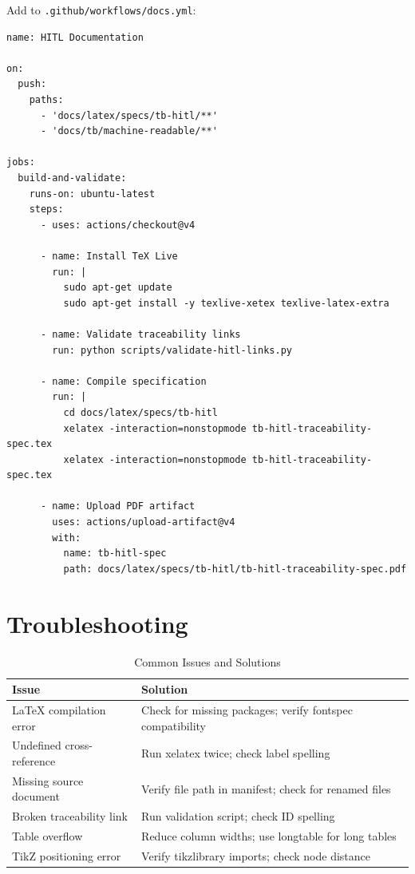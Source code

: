 Add to \texttt{.github/workflows/docs.yml}:

\begin{lstlisting}[language=yamlx,basicstyle=\ttfamily\small]
name: HITL Documentation

on:
  push:
    paths:
      - 'docs/latex/specs/tb-hitl/**'
      - 'docs/tb/machine-readable/**'

jobs:
  build-and-validate:
    runs-on: ubuntu-latest
    steps:
      - uses: actions/checkout@v4
      
      - name: Install TeX Live
        run: |
          sudo apt-get update
          sudo apt-get install -y texlive-xetex texlive-latex-extra
      
      - name: Validate traceability links
        run: python scripts/validate-hitl-links.py
      
      - name: Compile specification
        run: |
          cd docs/latex/specs/tb-hitl
          xelatex -interaction=nonstopmode tb-hitl-traceability-spec.tex
          xelatex -interaction=nonstopmode tb-hitl-traceability-spec.tex
      
      - name: Upload PDF artifact
        uses: actions/upload-artifact@v4
        with:
          name: tb-hitl-spec
          path: docs/latex/specs/tb-hitl/tb-hitl-traceability-spec.pdf
\end{lstlisting}

\section{Troubleshooting}
\label{sec:troubleshooting}

\begin{table}[h]
\centering
\caption{Common Issues and Solutions}
\begin{tabularx}{\textwidth}{@{}L{5cm}L{8.5cm}@{}}
\toprule
\textbf{Issue} & \textbf{Solution} \\
\midrule
LaTeX compilation error & Check for missing packages; verify fontspec compatibility \\
Undefined cross-reference & Run xelatex twice; check label spelling \\
Missing source document & Verify file path in manifest; check for renamed files \\
Broken traceability link & Run validation script; check ID spelling \\
Table overflow & Reduce column widths; use longtable for long tables \\
TikZ positioning error & Verify tikzlibrary imports; check node distance \\
\bottomrule
\end{tabularx}
\end{table}